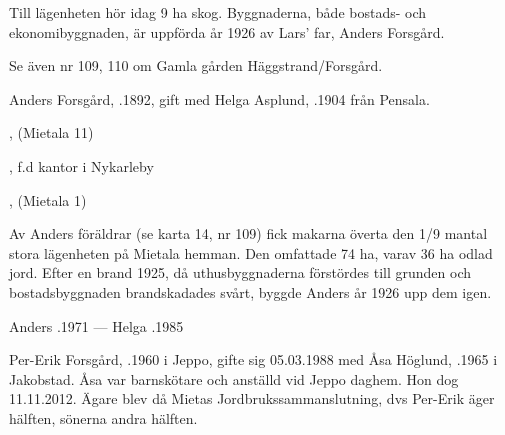 Till lägenheten hör idag 9 ha skog. Byggnaderna, både bostads- och ekonomibyggnaden, är uppförda år 1926 av Lars' far, Anders Forsgård.

Se även nr 109, 110 om Gamla gården Häggstrand/Forsgård.


%
Anders Forsgård, .1892, gift med Helga Asplund, .1904 från Pensala.
\begin{jhchildren}
  \item {}, (Mietala 11)
  \item {}, f.d kantor i Nykarleby
  \item {}, (Mietala  1)
  \item {}
  \item {}
\end{jhchildren}

Av Anders föräldrar (se karta 14, nr 109) fick makarna överta den 1/9 mantal stora lägenheten på Mietala hemman. Den omfattade 74 ha, varav 36 ha odlad jord. Efter en brand 1925, då uthusbyggnaderna förstördes till grunden och  bostadsbyggnaden  brandskadades svårt, byggde Anders år 1926 upp dem igen.

Anders .1971  ---  Helga .1985





%



%
Per-Erik Forsgård, .1960 i Jeppo, gifte sig 05.03.1988 med Åsa Höglund, .1965 i Jakobstad. Åsa var barnskötare och anställd vid Jeppo daghem. Hon dog 11.11.2012. Ägare blev då Mietas Jordbrukssammanslutning, dvs Per-Erik äger hälften, sönerna andra hälften.
\begin{jhchildren}
  \item {}
  \item {}
\end{jhchildren}

